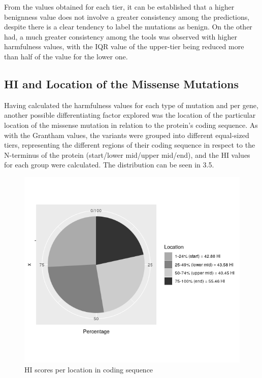 \documentclass[12pt,MSc,wordcount,anon]{muthesis}
\begin{document}
\begin{flushleft}
From the values obtained for each tier, it can be established that a higher benignness value does not involve a greater consistency among the predictions, despite there is a clear tendency to label the mutations as benign. On the other had, a much greater consistency among the tools was observed with higher harmfulness values, with the IQR value of the upper-tier being reduced more than half of the value for the lower one.

\subsection{HI and Location of the Missense Mutations}

Having calculated the harmfulness values for each type of mutation and per gene, another possible differentiating factor explored was the location of the particular location of the missense mutation in relation to the protein’s coding sequence.
As with the Grantham values, the variants were grouped into different equal-sized tiers, representing the different regions of their coding sequence in respect to the N-terminus of the protein (start/lower mid/upper mid/end), and the HI values for each group were calculated. The distribution can be seen in 3.5.

\begin{figure}
\begin{center}
\includegraphics[width=14cm]{img/pie}
\end{center}
\caption{HI scores per location in coding sequence}
\label{fig:fig-eg}  
\end{figure}


\end{flushleft}
\end{document}
